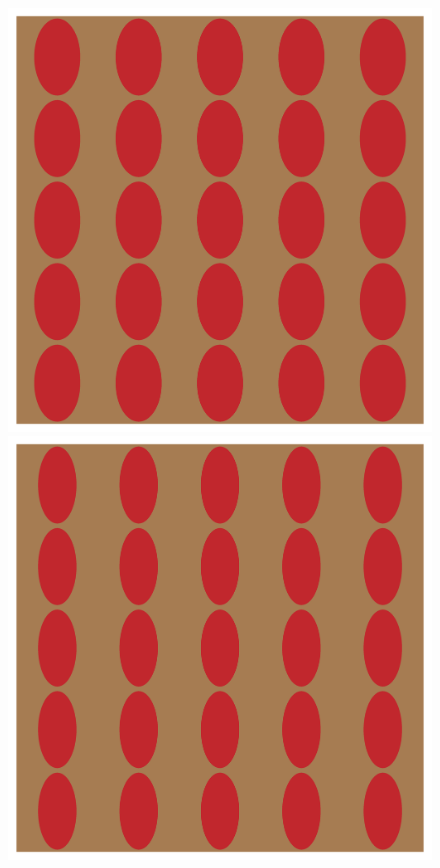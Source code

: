 \documentclass[a4paper,num-refs]{oup-contemporary}
\begin{document}
\begin{figure}
\begin{minipage}[b]{0.19\linewidth}
	\end{minipage} 
	\begin{minipage}[b]{0.19\linewidth}
		\includegraphics[width=\linewidth]{test_mesh_axR_0.6.png}
	\end{minipage} 
	\begin{minipage}[b]{0.19\linewidth}
		\includegraphics[width=\linewidth]{test_mesh_axR_0.5.png}

\end{minipage}
\end{figure}
\end{document}
